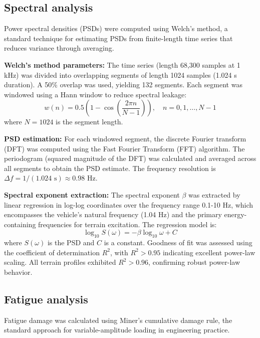 \documentclass[11pt,letterpaper]{article}
\begin{document}
\subsection{Spectral analysis}

Power spectral densities (PSDs) were computed using Welch's method\cite{Welch1967}, a standard technique for estimating PSDs from finite-length time series that reduces variance through averaging.

\textbf{Welch's method parameters:} The time series (length 68,300 samples at 1 kHz) was divided into overlapping segments of length 1024 samples (1.024 s duration). A 50\% overlap was used, yielding 132 segments. Each segment was windowed using a Hann window to reduce spectral leakage:
\begin{equation}
w(n) = 0.5\left(1 - \cos\left(\frac{2\pi n}{N-1}\right)\right), \quad n = 0, 1, \ldots, N-1
\end{equation}
where $N = 1024$ is the segment length.

\textbf{PSD estimation:} For each windowed segment, the discrete Fourier transform (DFT) was computed using the Fast Fourier Transform (FFT) algorithm. The periodogram (squared magnitude of the DFT) was calculated and averaged across all segments to obtain the PSD estimate. The frequency resolution is $\Delta f = 1/(1.024 \text{ s}) \approx 0.98$ Hz.

\textbf{Spectral exponent extraction:} The spectral exponent $\beta$ was extracted by linear regression in log-log coordinates over the frequency range 0.1-10 Hz, which encompasses the vehicle's natural frequency (1.04 Hz) and the primary energy-containing frequencies for terrain excitation. The regression model is:
\begin{equation}
\log_{10} S(\omega) = -\beta \log_{10} \omega + C
\end{equation}
where $S(\omega)$ is the PSD and $C$ is a constant. Goodness of fit was assessed using the coefficient of determination $R^2$, with $R^2 > 0.95$ indicating excellent power-law scaling. All terrain profiles exhibited $R^2 > 0.96$, confirming robust power-law behavior.

\subsection{Fatigue analysis}

Fatigue damage was calculated using Miner's cumulative damage rule\cite{Miner1945}, the standard approach for variable-amplitude loading in engineering practice.
\end{document}
